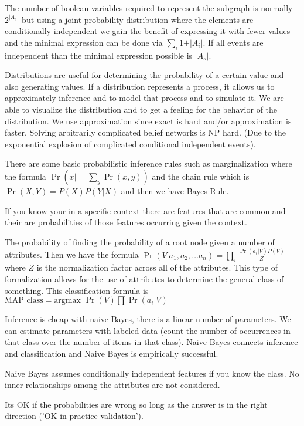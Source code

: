 \documentclass{article}
\begin{document}
The number of boolean variables required to represent the subgraph is normally 
$2^{\vert A_s\vert}$ but using a joint probability distribution where the 
elements are conditionally independent we gain the benefit of expressing it with
fewer values and the minimal expression can be done via $\sum_i 1 + \vert A_i 
\vert$. If all events are independent than the minimal expression possible is
$\vert A_s \vert$.

Distributions are useful for determining the probability of a certain value 
and also generating values. If a distribution represents a process, it allows
us to approximately inference and to model that process and to simulate it. We
are able to visualize the distribution and to get a feeling for the behavior 
of the distribution. We use approximation since exact is hard and/or
approximation is faster. Solving arbitrarily complicated belief networks is
NP hard. (Due to the exponential explosion of complicated conditional
independent events). 

There are some basic probabilistic inference rules such as marginalization
where the formula $\Pr(x \vert = \sum_y \Pr(x,y))$ and the chain rule which is
$\Pr(X,Y) = P(X)P(Y \vert X)$ and then we have Bayes Rule. 

If you know your in a specific context there are features that are common and 
their are probabilities of those features occurring given the context.

The probability of finding the probability of a root node given a number of 
attributes. Then we have the formula $\Pr(V \vert a_1, a_2, \ldots a_n) = 
\prod_i \frac{\Pr(a_i \vert V) P(V)}{Z}$ where $Z$ is the normalization factor
across all of the attributes. This type of formalization allows for the use
of attributes to determine the general class of something. This classification
formula is $\text{MAP class} = \text{argmax } \Pr(V)\prod \Pr(a_i \vert V)$

Inference is cheap with naive Bayes, there is a linear number of parameters. 
We can estimate parameters with labeled data (count the number of occurrences in
that class over the number of items in that class). Naive Bayes connects
inference and classification and Naive Bayes is empirically successful. 

Naive Bayes assumes conditionally independent features if you know the class. No
inner relationships among the attributes are not considered. 

Its OK if the probabilities are wrong so long as the answer is in the right 
direction ('OK in practice validation').
\end{document}
